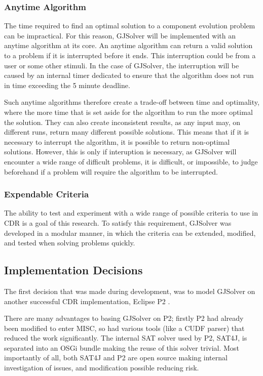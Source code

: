 \subsubsection{Anytime Algorithm}
The time required to find an optimal solution to a component evolution problem can be impractical.
For this reason, GJSolver will be implemented with an anytime algorithm at its core.
An anytime algorithm can return a valid solution to a problem if it is interrupted before it ends.
This interruption could be from a user or some other stimuli.
In the case of GJSolver, the interruption will be caused by an internal timer dedicated to ensure that the algorithm does not run in time exceeding the 5 minute deadline.

Such anytime algorithms therefore create a trade-off between time and optimality, where the more time that is set aside for the algorithm to run the more optimal the solution. 
They can also create inconsistent results, as any input may, on different runs, return many different possible solutions.
This means that if it is necessary to interrupt the algorithm, it is possible to return non-optimal solutions.
However, this is only if interuption is necessary, as GJSolver will encounter a wide range of difficult problems, 
it is difficult, or impossible, to judge beforehand if a problem will require the algorithm to be interrupted. 

\subsubsection{Expendable Criteria}
The ability to test and experiment with a wide range of possible criteria to use in CDR is a goal of this research.
To satisfy this requirement, GJSolver was developed in a modular manner, in which the criteria can be extended, modified, and tested when solving problems quickly.

\subsection{Implementation Decisions}
The first decision that was made during development, was to model GJSolver on another successful CDR implementation, Eclipse P2 \citep{le_berre_dependency_2009,leBerre2010}.

There are many advantages to basing GJSolver on P2; firstly P2 had already been modified to enter MISC, so had various tools (like a CUDF parser) that reduced the work significantly.
The internal SAT solver used by P2, SAT4J, is separated into an OSGi bundle making the reuse of this solver trivial.
Most importantly of all, both SAT4J and P2 are open source making internal investigation of issues, and modification possible reducing risk.

